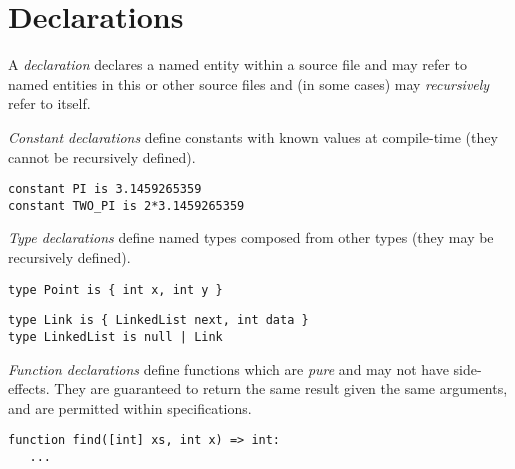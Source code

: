 \documentclass[a4paper,10pt,twcolumn]{article}
\begin{document}


\section*{Declarations}
A {\em declaration} declares a named entity within a source file and may refer to named entities in this or other source files and (in some cases) may {\em recursively} refer to itself.

{\em Constant declarations} define constants with known values at compile-time (they cannot be recursively defined).

\begin{lstlisting}
constant PI is 3.1459265359
constant TWO_PI is 2*3.1459265359
\end{lstlisting}

{\em Type declarations} define named types composed from other types (they may be recursively defined).

\begin{lstlisting}
type Point is { int x, int y }
\end{lstlisting}

\begin{lstlisting}
type Link is { LinkedList next, int data }
type LinkedList is null | Link
\end{lstlisting}

{\em Function declarations} define functions which are {\em pure} and may not have side-effects.  They are guaranteed to return the same result given the same arguments, and are permitted within specifications. 

\begin{lstlisting}
function find([int] xs, int x) => int:
   ...
\end{lstlisting}
\end{document}
